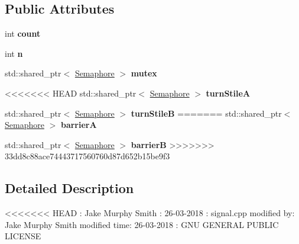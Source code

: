 \subsection*{Public Attributes}
\begin{DoxyCompactItemize}
\item 
int {\bfseries count}\hypertarget{class_barrier_a261549fd3fc57eb5c4066c8188d25100}{}\label{class_barrier_a261549fd3fc57eb5c4066c8188d25100}

\item 
int {\bfseries n}\hypertarget{class_barrier_a7da307d8df6bd44ab4e804a94e0c80c2}{}\label{class_barrier_a7da307d8df6bd44ab4e804a94e0c80c2}

\item 
std\+::shared\+\_\+ptr$<$ \hyperlink{class_semaphore}{Semaphore} $>$ {\bfseries mutex}\hypertarget{class_barrier_a256676c1a44ee4971333d2963998b556}{}\label{class_barrier_a256676c1a44ee4971333d2963998b556}

\item 
<<<<<<< HEAD
std\+::shared\+\_\+ptr$<$ \hyperlink{class_semaphore}{Semaphore} $>$ {\bfseries turn\+StileA}\hypertarget{class_barrier_a1dc3b91b9ef0966f3792689ad17f555a}{}\label{class_barrier_a1dc3b91b9ef0966f3792689ad17f555a}

\item 
std\+::shared\+\_\+ptr$<$ \hyperlink{class_semaphore}{Semaphore} $>$ {\bfseries turn\+StileB}\hypertarget{class_barrier_ac982078845654123a6ad2a2dbb2346e2}{}\label{class_barrier_ac982078845654123a6ad2a2dbb2346e2}
=======
std\+::shared\+\_\+ptr$<$ \hyperlink{class_semaphore}{Semaphore} $>$ {\bfseries barrierA}\hypertarget{class_barrier_ab0a31bf60cbafe8430035856ac1e3c9a}{}\label{class_barrier_ab0a31bf60cbafe8430035856ac1e3c9a}

\item 
std\+::shared\+\_\+ptr$<$ \hyperlink{class_semaphore}{Semaphore} $>$ {\bfseries barrierB}\hypertarget{class_barrier_a4b20bcf00ca8a135089a766c4ff37035}{}\label{class_barrier_a4b20bcf00ca8a135089a766c4ff37035}
>>>>>>> 33dd8c88ace74443717560760d87d652b15be9f3

\end{DoxyCompactItemize}


\subsection{Detailed Description}
<<<<<<< HEAD
\+: Jake Murphy Smith \+: 26-\/03-\/2018 \+: signal.\+cpp  modified by\+: Jake Murphy Smith  modified time\+: 26-\/03-\/2018 \+: G\+NU G\+E\+N\+E\+R\+AL P\+U\+B\+L\+IC L\+I\+C\+E\+N\+SE

